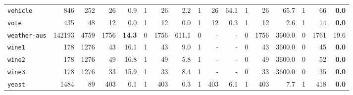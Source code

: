 \begin{tabular}{lccrrrrrrrrrrrrrr}
\texttt{vehicle} & \multicolumn{1}{r}{846} & \multicolumn{1}{r}{252}  & 26 & 0.9 & 1 & 26 & 2.2 & 1 & 26 & 64.1 & 1 & 26 & 65.7 & 1 & 66 & \textbf{0.0}\\
\texttt{vote} & \multicolumn{1}{r}{435} & \multicolumn{1}{r}{48}  & 12 & 0.0 & 1 & 12 & 0.0 & 1 & 12 & 0.3 & 1 & 12 & 2.6 & 1 & 14 & \textbf{0.0}\\
\texttt{weather-aus} & \multicolumn{1}{r}{142193} & \multicolumn{1}{r}{4759}  & 1756 & \textbf{14.3} & 0 & 1756 & 611.1 & 0 & - & - & 0 & 1756 & 3600.0 & 0 & 1761 & 19.6\\
\texttt{wine1} & \multicolumn{1}{r}{178} & \multicolumn{1}{r}{1276}  & 43 & 16.1 & 1 & 43 & 9.0 & 1 & - & - & 0 & 43 & 3600.0 & 0 & 45 & \textbf{0.0}\\
\texttt{wine2} & \multicolumn{1}{r}{178} & \multicolumn{1}{r}{1276}  & 49 & 16.8 & 1 & 49 & 5.8 & 1 & - & - & 0 & 49 & 3600.0 & 0 & 52 & \textbf{0.0}\\
\texttt{wine3} & \multicolumn{1}{r}{178} & \multicolumn{1}{r}{1276}  & 33 & 15.9 & 1 & 33 & 8.4 & 1 & - & - & 0 & 33 & 3600.0 & 0 & 35 & \textbf{0.0}\\
\texttt{yeast} & \multicolumn{1}{r}{1484} & \multicolumn{1}{r}{89}  & 403 & 0.1 & 1 & 403 & 0.3 & 1 & 403 & 6.1 & 1 & 403 & 7.7 & 1 & 418 & \textbf{0.0}\\
\bottomrule
\end{tabular}
